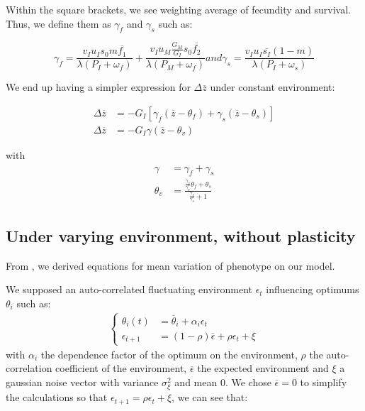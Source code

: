 Within the square brackets, we see weighting average of fecundity and survival. Thus, we define them as $\gamma_{f}$ and $\gamma_{s}$ such as:

\begin{subequations}
	\begin{equation}
	\label{eq:gammaf}
	\gamma_{f} = \frac{v_{I} u_{I} s_{0} m \overline{f_{1}} }{\lambda(P_{I}+\omega_{f})} + \frac{ v_{I} u_{M} \frac{G_{M}}{G_{I}} s_{0} \overline{f_{2}}}{\lambda ( P_{M} + \omega_{f} )}
	\end{equation}
	and
	\begin{equation}
	\label{eq:gammas}
	\gamma_{s} = \frac{ v_{I} u_{I} \overline{s_{I}} (1-m) }{\lambda(P_{I}+\omega_{s})}
	\end{equation}
\end{subequations}

We end up having a simpler expression for $\Delta\overline{z}$ under constant environment:

\begin{align}
	\Delta\overline{z} &= -G_{I} \left[ \gamma_{f}(\overline{z} - \theta_{f}) + \gamma_{s}(\overline{z} - \theta_{s}) \right] \nonumber \\
	\Delta\overline{z} &= - G_{I} \gamma(\overline{z} - \theta_{v})
\end{align}

with
\begin{align}
	\label{eq:gamma}
	\gamma &= \gamma_{f} + \gamma_{s} \\
	\label{eq:thetav}
	\theta_{v} &= \frac{\frac{\gamma_{f}}{\gamma_{s}}\theta_{f} + \theta_{s}}{\frac{\gamma_{f}}{\gamma_{s}} + 1}
\end{align}

\subsection*{Under varying environment, without plasticity}
From \citet{engen_evolution_2011}, we derived equations for mean variation of phenotype on our model.

We supposed an auto-correlated fluctuating environment $\epsilon_{t}$ influencing optimums $\theta_{i}$ such as:
\begin{align}
	\label{eq:epstheta}
\left\{
	\begin{aligned}
		\theta_{i}(t) &= \overline{\theta}_{i} + \alpha_{i}\epsilon_{t}\\
		\epsilon_{t+1} &= (1-\rho)\overline{\epsilon} + \rho\epsilon_{t} + \xi
	\end{aligned}
\right.
\end{align}
with $\alpha_{i}$ the dependence factor of the optimum on the environment, $\rho$ the auto-correlation coefficient of the environment, $\overline{\epsilon}$ the expected environment and $\xi$ a gaussian noise vector with variance $\sigma^{2}_{\xi}$ and mean $0$. We chose $\overline{\epsilon}=0$ to simplify the calculations so that $\epsilon_{t+1} = \rho\epsilon_{t} + \xi$, we can see that:

